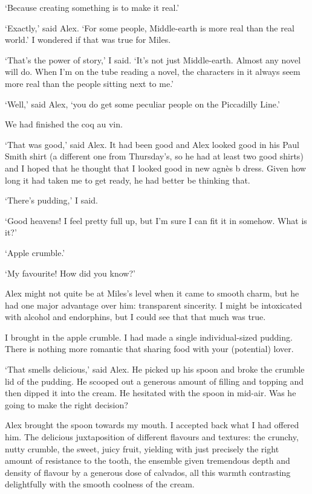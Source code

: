 `Because creating something is to make it real.'

`Exactly,' said Alex. `For some people, Middle-earth is more real
than the real world.' I wondered if that was true for Miles.

`That's the power of story,' I said. `It's not just Middle-earth.
Almost any novel will do. When I'm on the tube reading a novel, the
characters in it always seem more real than the people sitting next
to me.'

`Well,' said Alex, `you do get some peculiar people on the
Piccadilly Line.'

We had finished the coq au vin.

`That was good,' said Alex. It had been good and Alex looked good in
his Paul Smith shirt (a different one from Thursday's, so he had at
least two good shirts) and I hoped that he thought that I looked
good in new agnès b dress. Given how long it had taken me to get
ready, he had better be thinking that.

`There's pudding,' I said.

`Good heavens! I feel pretty full up, but I'm sure I can fit it in
somehow. What is it?'

`Apple crumble.'

`My favourite! How did you know?'

Alex might not quite be at Miles's level when it came to smooth
charm, but he had one major advantage over him: transparent
sincerity. I might be intoxicated with alcohol and endorphins, but I
could see that that much was true.

I brought in the apple crumble. I had made a single individual-sized
pudding. There is nothing more romantic that sharing food with your
(potential) lover.

`That smells delicious,' said Alex. He picked up his spoon and broke
the crumble lid of the pudding. He scooped out a generous amount of
filling and topping and then dipped it into the cream. He hesitated
with the spoon in mid-air. Was he going to make the right decision?

Alex brought the spoon towards my mouth. I accepted back what I had
offered him. The delicious juxtaposition of different flavours and
textures: the crunchy, nutty crumble, the sweet, juicy fruit,
yielding with just precisely the right amount of resistance to the
tooth, the ensemble given tremendous depth and density of flavour by
a generous dose of calvados, all this warmth contrasting
delightfully with the smooth coolness of the cream.

